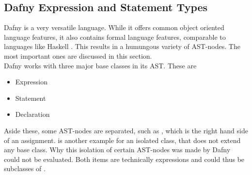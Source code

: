 \subsection{Dafny Expression and Statement Types}
\label{section:analysis_dafnyASTStuff}
Dafny is a very versatile language.
While it offers common object oriented language features, it also contains formal language features, comparable to languages like Haskell \cite{haskell}.
This results in a humungous variety of AST-nodes.
The most important ones are discussed in this section.\\

Dafny works with three major base classes in its AST.
These are
\begin{itemize}
    \item Expression
    \item Statement
    \item Declaration
\end{itemize}
Aside these, some AST-nodes are separated, such as , which is the right hand side of an assignment.
 is another example for an isolated class, that does not extend any base class.
Why this isolation of certain AST-nodes was made by Dafny could not be evaluated.
Both items are technically expressions and could thus be subclasses of .

